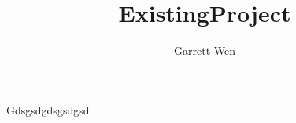 \documentclass[11pt]{article}
\title{ExistingProject}
\author{Garrett Wen}
\begin{document}
\maketitle
\tableofcontents


Gdsgsdgdsgsdgsd
\cite{exampleBook}


\end{document}
